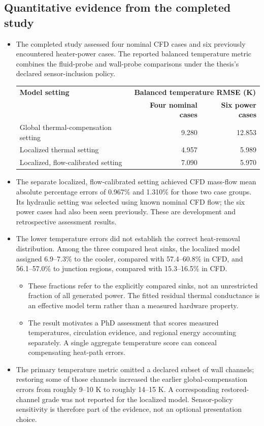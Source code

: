 \subsection{Quantitative evidence from the completed study}\label{subsec:quantitative-preliminary-evidence}
\begin{itemize}[leftmargin=*]
\item The completed study assessed four nominal CFD cases and six previously encountered heater-power cases. The reported balanced temperature metric combines the fluid-probe and wall-probe comparisons under the thesis's declared sensor-inclusion policy.\cite{fierro2026cfdoneD}
\begin{center}
\small
\begin{tabular}{@{}p{3.05in}rr@{}}
\toprule
\textbf{Model setting} & \multicolumn{2}{c}{\textbf{Balanced temperature RMSE (K)}}\\
 & \textbf{Four nominal cases} & \textbf{Six power cases}\\
\midrule
Global thermal-compensation setting & 9.280 & 12.853\\
Localized thermal setting & 4.957 & 5.989\\
Localized, flow-calibrated setting & 7.090 & 5.970\\
\bottomrule
\end{tabular}
\end{center}
\item The separate localized, flow-calibrated setting achieved CFD mass-flow mean absolute percentage errors of 0.967\% and 1.310\% for those two case groups. Its hydraulic setting was selected using known nominal CFD flow; the six power cases had also been seen previously. These are development and retrospective assessment results.\cite{fierro2026cfdoneD}
\item The lower temperature errors did not establish the correct heat-removal distribution. Among the three compared heat sinks, the localized model assigned 6.9--7.3\% to the cooler, compared with 57.4--60.8\% in CFD, and 56.1--57.0\% to junction regions, compared with 15.3--16.5\% in CFD.
\begin{itemize}
\item These fractions refer to the explicitly compared sinks, not an unrestricted fraction of all generated power. The fitted residual thermal conductance is an effective model term rather than a measured hardware property.
\item The result motivates a PhD assessment that scores measured temperatures, circulation evidence, and regional energy accounting separately. A single aggregate temperature score can conceal compensating heat-path errors.
\end{itemize}
\item The primary temperature metric omitted a declared subset of wall channels; restoring some of those channels increased the earlier global-compensation errors from roughly 9--10 K to roughly 14--15 K. A corresponding restored-channel grade was not reported for the localized model. Sensor-policy sensitivity is therefore part of the evidence, not an optional presentation choice.
\end{itemize}


